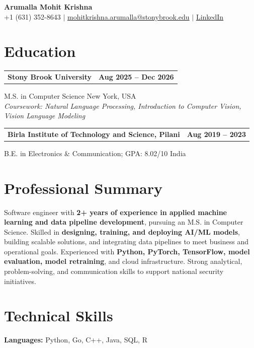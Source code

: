 \documentclass[letterpaper,10pt]{article}
\makeatletter
\newcommand{\entry}[2]{%
  \noindent
  \begin{tabularx}{\linewidth}
    {@{}>{\raggedright\arraybackslash}X@{\hspace{6pt}}r@{}}
    \textbf{#1} & #2
  \end{tabularx}\par
}
\makeatother
\begin{document}
\begin{center}
    {\LARGE\bfseries Arumalla Mohit Krishna}\\[3pt]
    +1 (631) 352-8643 $|$
    \href{mailto:mohitkrishna.arumalla@stonybrook.edu}
    {mohitkrishna.arumalla@stonybrook.edu} $|$
    \href{https://linkedin.com/in/mohit-krishna-arumalla}
    {LinkedIn}
\end{center}
\vspace{-8pt}

\section{Education}

\entry
  {\textbf{Stony Brook University}}
  {\textbf{Aug 2025 -- Dec 2026}}

M.S. in Computer Science \hfill New York, USA\\
\textit{
Coursework: Natural Language Processing,
Introduction to Computer Vision, Vision Language Modeling
}
\vspace{3pt}

\entry
  {\textbf{Birla Institute of Technology and Science, Pilani}}
  {\textbf{Aug 2019 -- 2023}}

B.E. in Electronics \& Communication; GPA: 8.02/10 \hfill India
\section{Professional Summary}

Software engineer with \textbf{2+ years of experience in applied machine learning and data pipeline development}, pursuing an M.S. in Computer Science. Skilled in \textbf{designing, training, and deploying AI/ML models}, building scalable solutions, and integrating data pipelines to meet business and operational goals. Experienced with \textbf{Python, PyTorch, TensorFlow, model evaluation, model retraining}, and cloud infrastructure. Strong analytical, problem-solving, and communication skills to support national security initiatives.

\section{Technical Skills}

\textbf{Languages:}
Python, Go, C++, Java, SQL, R\\
\end{document}
